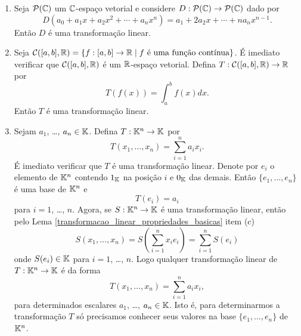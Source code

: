 \begin{exemplo}
\begin{enumerate}
		\item Seja $\mathcal{P}(\mathbb{C})$ um $\mathbb{C}$-espa\c{c}o vetorial e considere $D : \mathcal{P}(\mathbb{C}) \to \mathcal{P}(\mathbb{C})$ dado por
		\[
			D(a_0 + a_1x + a_2x^2 + \cdots + a_nx^n) = a_1 + 2a_2x + \cdots + na_nx^{n-1}.
		\]
		Ent\~ao $D$ \'e uma transforma\c{c}\~ao linear.

		\item Seja $\mathcal{C}([a,b], \real) = \{ f : [a,b] \to \real \mid f \mbox{ \'e uma fun\c{c}\~ao cont{\'\i}nua}\}$. \'E imediato verificar que $\mathcal{C}([a,b], \mathbb{R})$ \'e um $\mathbb{R}$-espa\c{c}o vetorial. Defina $T : \mathcal{C}([a,b], \mathbb{R}) \to \mathbb{R}$ por
		\[
			T(f(x)) = \int_a^bf(x)dx.
		\]
		Ent\~ao $T$ \'e uma transforma\c{c}\~ao linear.

		\item Sejam $a_1$, \dots, $a_n \in \mathbb{K}$. Defina $T : \mathbb{K}^n \to \mathbb{K}$ por
		\[
			T(x_1, \dots, x_n) = \sum_{i=1}^na_ix_i.
		\]
		\'E imediato verificar que $T$ \'e uma transforma\c{c}\~ao linear. Denote por $e_i$ o elemento de $\mathbb{K}^n$ contendo $1_{\mathbb{K}}$ na posi\c{c}\~ao $i$ e $0_{\mathbb{K}}$ das demais. Ent\~ao $\{e_1, \dots, e_n\}$ \'e uma base de $\mathbb{K}^n$ e
		\[
			T(e_i) = a_i
		\]
		para $i = 1$, \dots, $n$. Agora, se $S : \mathbb{K}^n \to \mathbb{K}$ \'e uma transforma\c{c}\~ao linear, ent\~ao pelo Lema \ref{transformacao_linear_propriedades_basicas} item (c)
		\[
			S(x_1, \dots, x_n) = S(\sum_{i=1}^nx_ie_i) = \sum_{i=1}^nS(e_i)
		\]
		onde $S(e_i) \in \mathbb{K}$ para $i = 1$, \dots, $n$. Logo qualquer transforma\c{c}\~ao linear de $T : \mathbb{K}^n \to \mathbb{K}$ \'e da forma
		\[
			T(x_1, \dots, x_n) = \sum_{i=1}^na_ix_i,
		\]
		para determinados escalares $a_1$, \dots, $a_n \in \mathbb{K}$. Isto \'e, para determinarmos a transforma\c{c}\~ao $T$ s\'o precisamos conhecer seus valores na base $\{e_1, \dots, e_n\}$ de $\mathbb{K}^n$.
	\end{enumerate}
\end{exemplo}

